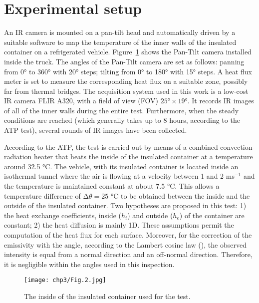 \section{Experimental setup}
An IR camera is mounted on a pan-tilt head and automatically driven by a suitable software to map the temperature of the inner walls of the insulated container on a refrigerated vehicle. Figure~\ref{Exp_setup} shows the Pan-Tilt camera installed inside the truck. The angles of the Pan-Tilt camera are set as follows: panning from 0° to 360° with 20° steps; tilting from 0° to 180° with 15° steps. A heat flux meter is set to measure the corresponding heat flux on a suitable zone, possibly far from thermal bridges. The acquisition system used in this work is a low-cost IR camera FLIR A320, with a field of view (FOV) $ 25°×19° $. It records IR images of all of the inner walls during the entire test. Furthermore, when the steady conditions are reached (which generally takes up to 8 hours, according to the ATP test), several rounds of IR images have been collected.

According to the ATP, the test is carried out by means of a combined convection-radiation heater that heats the inside of the insulated container at a temperature around 32.5 °C. The vehicle, with its insulated container is located inside an isothermal tunnel where the air is flowing at a velocity between 1 and 2 ms$^{−1}$ and the temperature is maintained constant at about 7.5 °C. This allows a temperature difference of $ ∆\theta  = 25 $ °C to be obtained between the inside and the outside of the insulated container. Two hypotheses are proposed in this test: 1) the heat exchange coefficients, inside ($ h_i $) and outside ($ h_e $) of the container are constant; 2) the heat diffusion is mainly 1D. These assumptions permit the computation of the heat flux for each surface. Moreover, for the correction of the emissivity with the angle, according to the Lambert cosine law (\citet{dragano2009experimental,Hottel1967a}), the observed intensity is equal from a normal direction and an off-normal direction. Therefore, it is negligible within the angles used  in this inspection.
\begin{figure}[ht]
    \centering
    \texttt{[image: chp3/Fig.2.jpg]}
    \caption{The inside of the insulated container used for the test.}
    \label{Exp_setup}
\end{figure}


